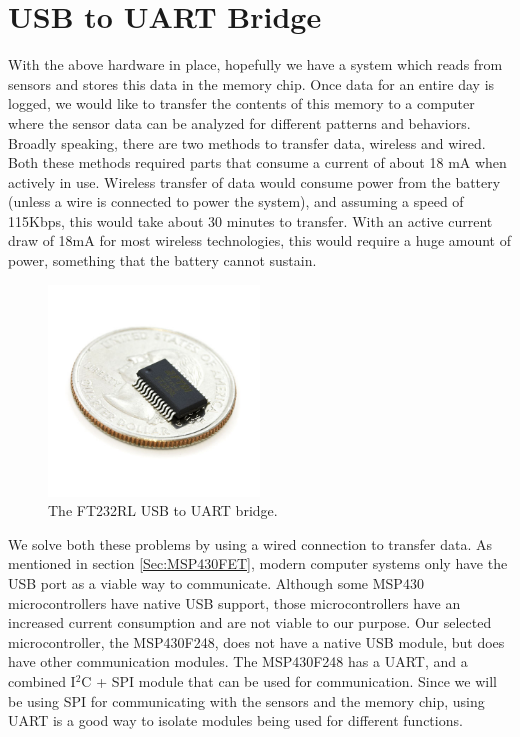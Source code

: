 \section{USB to UART Bridge}
\label{Sec:FT232}
With the above hardware in place, hopefully we have a system which reads from sensors and stores this data in the memory chip. Once data for an entire day is logged, we would like to transfer the contents of this memory to a computer where the sensor data can be analyzed for different patterns and behaviors. Broadly speaking, there are two methods to transfer data, wireless and wired. Both these methods required parts that consume a current of about 18 mA when actively in use. Wireless transfer of data would consume power from the battery (unless a wire is connected to power the system), and assuming a speed of 115Kbps, this would take about 30 minutes to transfer. With an active current draw of 18mA for most wireless technologies, this would require a huge amount of power, something that the battery cannot sustain.
\begin{figure}
\begin{center}
\includegraphics[width=0.5\textwidth]{images/FT232coin.jpg}
\caption{The FT232RL USB to UART bridge.}
\label{Fig:FT232}
\end{center}
\end{figure}

We solve both these problems by using a wired connection to transfer data. As mentioned in section \ref{Sec:MSP430FET}, modern computer systems only have the USB port as a viable way to communicate. Although some MSP430 microcontrollers have native USB support, those microcontrollers have an increased current consumption and are not viable to our purpose. Our selected microcontroller, the MSP430F248, does not have a native USB module, but does have other communication modules. The MSP430F248 has a UART, and a combined I$^2$C + SPI module that can be used for communication. Since we will be using SPI for communicating with the sensors and the memory chip, using UART is a good way to isolate modules being used for different functions.

